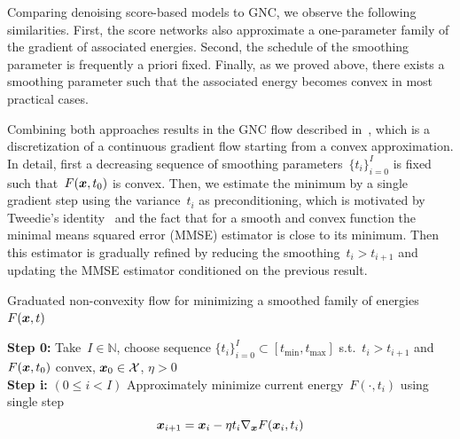 \documentclass{article}
\newcommand{\N}{\mathbb{N}}
\newcommand{\X}{\mathcal{X}}
\newcommand{\tmin}{t_\mathrm{min}}
\newcommand{\tmax}{t_\mathrm{max}}
\theoremstyle{plain}
\theoremstyle{definition}
\theoremstyle{remark}
\begin{document}
Comparing denoising score-based models to GNC, we observe the following similarities.
First, the score networks also approximate a one-parameter family of the gradient of associated energies.
Second, the schedule of the smoothing parameter is frequently a priori fixed.
Finally, as we proved above, there exists a smoothing parameter such that the associated energy becomes convex in most practical cases.

Combining both approaches results in the GNC flow described in~, which is a discretization of a continuous gradient flow starting from a convex approximation.
In detail, first a decreasing sequence of smoothing parameters~$\{t_i\}_{i=0}^I$ is fixed such that~$F({\bm{x}},t_0)$ is convex.
Then, we estimate the minimum by a single gradient step using the variance~$t_i$ as preconditioning, which is motivated by Tweedie's identity~\citep{Ro56,Ef11} and the fact that for a smooth and convex function the minimal means squared error (MMSE) estimator is close to its minimum.
Then this estimator is gradually refined by reducing the smoothing~$t_i>t_{i+1}$ and updating the MMSE estimator conditioned on the previous result.

\begin{algorithm}[t]
\caption{Graduated non-convexity flow for minimizing a smoothed family of energies~$F({\bm{x}},t)$}\label{alg:graduatedNC}
\textbf{Step 0:} Take~$I\in\N$, choose sequence $\{t_i\}_{i=0}^I\subset[\tmin,\tmax]$ s.t.~$t_{i}>t_{i+1}$ and~$F({\bm{x}},t_0)$ convex, $\vx_0\in\X$, $\eta>0$ \\
\textbf{Step i:} $(0\leq i< I)$ 
Approximately minimize current energy~$F(\cdot,t_i)$ using single step
\[
{\bm{x}}_{i+1}={\bm{x}}_i-\eta t_i\nabla_{\bm{x}} F({\bm{x}}_i,t_i)
\] 
\end{algorithm}
\end{document}
